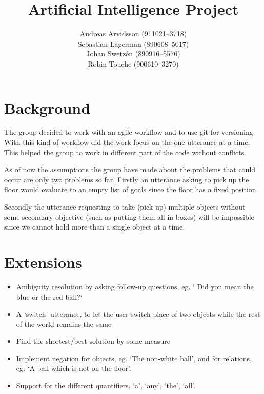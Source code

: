 \documentclass[a4paper]{article}
\title{Artificial Intelligence Project}
\date{}
\author{Andreas Arvidsson (911021--3718) \\
        Sebastian Lagerman (890608--5017) \\
        Johan Swetz\'{e}n (890916--5576) \\
        Robin Touche (900610--3270)}
\begin{document}
\maketitle

\section*{Background}
The group decided to work with an agile workflow and to use git for versioning.
With this kind of workflow did the work focus on the one utterance at a time.
This helped the group to work in different part of the code without conflicts.

As of now the assumptions the group have made about the problems that could
occur are only two problems so far. Firstly an utterance asking to pick up the
floor would evaluate to an empty list of goals since the floor has a fixed
position.

Secondly the utterance requesting to take (pick up) multiple objects
without some secondary objective (such as putting them all in boxes) will be
impossible since we cannot hold more than a single object at a time.









\section*{Extensions}
\begin{itemize}
\item Ambiguity resolution by asking follow-up questions, eg. ` Did you mean the blue or the red ball?`
\item A `switch' utterance, to let the user switch place of two objects while the rest of the world remains the same
\item Find the shortest/best solution by some measure
\item Implement negation for objects, eg. `The non-white ball', and for relations, eg. `A ball which is not on the floor'.
\item Support for the different quantifiers, `a', `any', `the', `all'.
\end{itemize}
\end{document}
